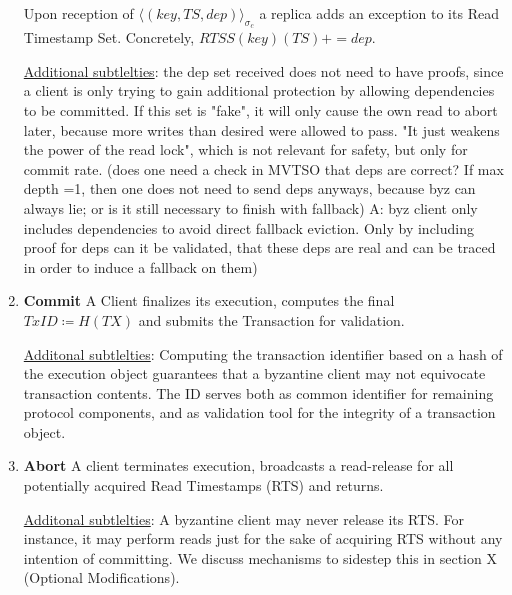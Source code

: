 \begin{enumerate}
Upon reception of $\langle (key, TS, dep)\rangle_{\sigma_c}$ a replica adds an exception to its Read Timestamp Set. Concretely, $RTSS(key)(TS) += dep$.

\underline{Additional subtlelties}: the dep set received does not need to have proofs, since a client is only trying to gain additional protection by allowing dependencies to be committed. If this set is "fake", it will only cause the own read to abort later, because more writes than desired were allowed to pass. "It just weakens the power of the read lock", which is not relevant for safety, but only for commit rate.
(does one need a check in MVTSO that deps are correct? If max depth =1, then one does not need to send deps anyways, because byz can always lie; or is it still necessary to finish with fallback)
A: byz client only includes dependencies to avoid direct fallback eviction. Only by including proof for deps can it be validated, that these deps are real and can be traced in order to induce a fallback on them)



\item \textbf{Commit} A Client finalizes its execution, computes the final $TxID \coloneqq H(TX)$  and submits the Transaction for validation.

\underline{Additonal subtlelties}: Computing the transaction identifier based on a hash of the execution object guarantees that a byzantine client may not equivocate transaction contents. The ID serves both as common identifier for remaining protocol components, and as validation tool for the integrity of a transaction object.

\item \textbf{Abort} A client terminates execution, broadcasts a read-release for all potentially acquired Read Timestamps (RTS) and returns.

\underline{Additonal subtlelties}: A byzantine client may never release its RTS. For instance, it may perform reads just for the sake of acquiring RTS without any intention of committing. We discuss mechanisms to sidestep this in section X (Optional Modifications).

\end{enumerate}

 
